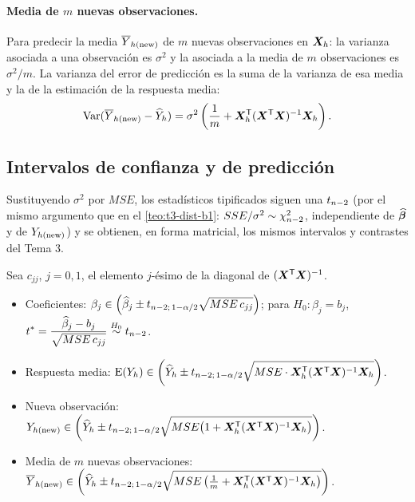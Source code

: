\paragraph{Media de $m$ nuevas observaciones.} Para predecir la media $\overline{Y}_{h(\mathrm{new})}$ de $m$ nuevas
observaciones en $\bm{X}_h$: la varianza asociada a una observación es $\sigma^2$ y la asociada a
la media de $m$ observaciones es $\sigma^2/m$. La varianza del error de predicción es la suma de la
varianza de esa media y la de la estimación de la respuesta media:
\[
  \operatorname{Var}(\overline{Y}_{h(\mathrm{new})}-\widehat{Y}_h) = \sigma^2\left(\frac1m+\bm{X}_h^{\mathsf{T}}(\bm{X}^{\mathsf{T}}\bm{X})^{-1}\bm{X}_h\right).
\]

\subsection{Intervalos de confianza y de predicción}

Sustituyendo $\sigma^2$ por $MSE$, los estadísticos tipificados siguen una $t_{n-2}$ (por el
mismo argumento que en el \cref{teo:t3-dist-b1}: $SSE/\sigma^2\sim\chi^2_{n-2}$, independiente de
$\widehat{\bm{\beta}}$ y de $Y_{h(\mathrm{new})}$) y se obtienen, en forma matricial, los mismos intervalos y contrastes del
Tema 3.

\begin{resumen}
  Sea $c_{jj}$, $j=0,1$, el elemento $j$-ésimo de la diagonal de $(\bm{X}^{\mathsf{T}}\bm{X})^{-1}$.
  \begin{itemize}
    \item Coeficientes:
      $\displaystyle \beta_j\in\left(\widehat{\beta}_j\pm t_{n-2;\,1-\alpha/2}\sqrt{MSE\,c_{jj}}\right)$;
      para $H_0\colon\beta_j=b_j$,
      $\displaystyle t^*=\frac{\widehat{\beta}_j-b_j}{\sqrt{MSE\,c_{jj}}}\overset{H_0}{\sim}t_{n-2}$.
    \item Respuesta media:
      $\displaystyle \operatorname{E}(Y_h)\in\left(\widehat{Y}_h\pm t_{n-2;\,1-\alpha/2}
      \sqrt{MSE\cdot\bm{X}_h^{\mathsf{T}}(\bm{X}^{\mathsf{T}}\bm{X})^{-1}\bm{X}_h}\right)$.
    \item Nueva observación:
      $\displaystyle Y_{h(\mathrm{new})}\in\left(\widehat{Y}_h\pm t_{n-2;\,1-\alpha/2}
      \sqrt{MSE\big(1+\bm{X}_h^{\mathsf{T}}(\bm{X}^{\mathsf{T}}\bm{X})^{-1}\bm{X}_h\big)}\right)$.
    \item Media de $m$ nuevas observaciones:
      $\displaystyle \overline{Y}_{h(\mathrm{new})}\in\left(\widehat{Y}_h\pm t_{n-2;\,1-\alpha/2}
      \sqrt{MSE\left(\tfrac1m+\bm{X}_h^{\mathsf{T}}(\bm{X}^{\mathsf{T}}\bm{X})^{-1}\bm{X}_h\right)}\right)$.
  \end{itemize}
\end{resumen}
